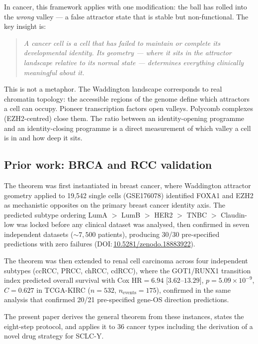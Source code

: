 \documentclass[11pt, a4paper]{article}
\begin{document}
In cancer, this framework applies with one modification:
the ball has rolled into the \emph{wrong} valley --- a
false attractor state that is stable but non-functional.
The key insight is:

\begin{quote}
\textit{A cancer cell is a cell that has failed to
maintain or complete its developmental identity.
Its geometry --- where it sits in the attractor
landscape relative to its normal state --- determines
everything clinically meaningful about it.}
\end{quote}

This is not a metaphor. The Waddington landscape
corresponds to real chromatin topology: the accessible
regions of the genome define which attractors a cell
can occupy. Pioneer transcription factors open valleys.
Polycomb complexes (EZH2-centred) close them. The
ratio between an identity-opening programme and an
identity-closing programme is a direct measurement of
which valley a cell is in and how deep it sits.

\subsection{Prior work: BRCA and RCC validation}

The theorem was first instantiated in breast cancer,
where Waddington attractor geometry applied to
19,542 single cells (GSE176078) identified FOXA1
and EZH2 as mechanistic opposites on the primary
breast cancer identity axis. The predicted subtype
ordering LumA $>$ LumB $>$ HER2 $>$ TNBC $>$
Claudin-low was locked before any clinical dataset
was analysed, then confirmed in seven independent
datasets (${\sim}7{,}500$ patients), producing
30/30 pre-specified predictions with zero failures
(DOI:\,\href{https://doi.org/10.5281/zenodo.18883922}{10.5281/zenodo.18883922}).

The theorem was then extended to renal cell carcinoma
across four independent subtypes (ccRCC, PRCC, chRCC,
cdRCC), where the GOT1/RUNX1 transition index predicted
overall survival with Cox HR$=6.94$ [$3.62$--$13.29$],
$p = 5.09 \times 10^{-9}$, $C=0.627$ in TCGA-KIRC
($n=532$, $n_\text{events}=175$), confirmed in the
same analysis that confirmed 20/21 pre-specified
gene-OS direction predictions.

The present paper derives the general theorem from
these instances, states the eight-step protocol, and
applies it to 36 cancer types including the derivation
of a novel drug strategy for SCLC-Y.
\end{document}
